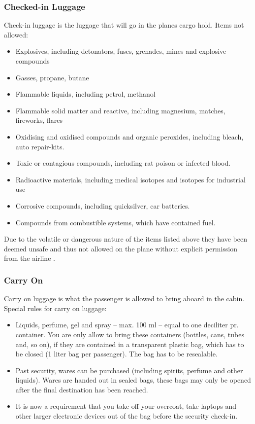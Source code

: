 \subsubsection{Checked-in Luggage}
Check-in luggage is the luggage that will go in the planes cargo hold.
\newline 
Items not allowed:
\begin{itemize}
\item Explosives, including detonators, fuses, grenades, mines and explosive compounds
\item Gasses, propane, butane
\item Flammable liquids, including petrol, methanol
\item Flammable solid matter and reactive, including magnesium, matches, fireworks, flares
\item Oxidising and oxidised compounds and organic peroxides, including bleach, auto repair-kits.
\item Toxic or contagious compounds, including rat poison or infected blood.
\item Radioactive materials, including medical isotopes and isotopes for industrial use
\item Corrosive compounds, including quicksilver, car batteries.
\item Compounds from combustible systems, which have contained fuel.
\end{itemize}
Due to the volatile or dangerous nature of the items listed above they have been deemed unsafe and thus not allowed on the plane without explicit permission from the airline \citep{DangerousGoods}.

\subsubsection{Carry On}
Carry on luggage is what the passenger is allowed to bring aboard in the cabin.
\newline
Special rules for carry on luggage:
\begin{itemize}
\item Liquids, perfume, gel and spray – max. 100 ml – equal to one deciliter pr. container. You are only allow to bring these containers (bottles, cans, tubes and, so on), if they are contained in a transparent plastic bag, which has to be closed (1 liter bag per passenger). The bag has to be resealable.
\item Past security, wares can be purchased (including spirits, perfume and other liquids). Wares are handed out in sealed bags, these bags may only be opened after the final destination has been reached.
\item It is now a requirement that you take off your overcoat, take laptops and other larger electronic devices out of the bag before the security check-in.
\citep{Prohibited_luggage}
\end{itemize}

